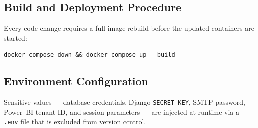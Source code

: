 \begin{sloppypar}
\subsection{Build and Deployment Procedure}

Every code change requires a full image rebuild before the updated containers
are started:

\begin{verbatim}
docker compose down && docker compose up --build
\end{verbatim}

\subsection{Environment Configuration}

Sensitive values --- database credentials, Django \texttt{SECRET\_KEY}, SMTP
password, Power~BI tenant ID, and session parameters --- are injected at
runtime via a \texttt{.env} file that is excluded from version control.

\end{sloppypar}

